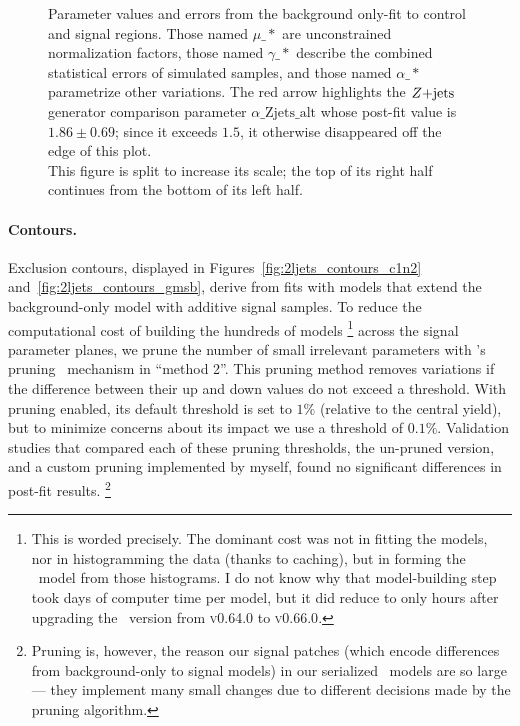 \begin{figure}[tp]
\centering
{}
\hfill
{}
\caption[
Parameter values and errors from the background only-fit to control and signal
regions
]{%
Parameter values and errors from the background only-fit to control and signal
regions.
Those named $\mu\_*$ are unconstrained normalization factors,
those named $\gamma\_*$ describe the combined statistical errors of simulated
samples,
and those named $\alpha\_*$ parametrize other variations.
The red arrow highlights the $Z\mathrm{+jets}$ generator comparison parameter
$\alpha\mathrm{\_Zjets\_alt}$ whose post-fit value is
$1.86 \pm 0.69$;
since it exceeds $1.5$, it otherwise disappeared off the edge of this plot.
\\[0.5em]
This figure is split to increase its scale; the top of its right half continues
from the bottom of its left half.
}
\label{fig:2ljets_fit_parameters}
\end{figure}

\paragraph{Contours.}
Exclusion contours, displayed in
Figures~\ref{fig:2ljets_contours_c1n2} and~\ref{fig:2ljets_contours_gmsb},
derive from fits with models that extend the background-only model with
additive signal samples.
To reduce the computational cost of building the hundreds of models%
\footnote{%
This is worded precisely. The dominant cost was not in fitting the models, nor
in histogramming the data (thanks to caching), but in forming the
\histfactory\ model from those histograms.
I do not know why that model-building step took days of computer time per
model, but it did reduce to only hours after upgrading the \histfitter\ version
from \textsc{v0.64.0} to \textsc{v0.66.0}.
}
across the signal parameter planes, we prune the number of small irrelevant
parameters with \histfitter's pruning~\cite{histfittergithub} mechanism in
``method 2''.
This pruning method removes variations if the difference between their up and
down values do not exceed a threshold.
With pruning enabled, its default threshold is set to $1\%$ (relative to the
central yield), but to minimize concerns about its impact we use a threshold
of $0.1\%$.
Validation studies that compared each of these pruning thresholds, the
un-pruned version, and a custom pruning implemented by myself, found no
significant differences in post-fit results.%
\footnote{%
Pruning is, however, the reason our signal patches (which encode differences
from background-only to signal models) in our serialized \hepdata\ models are
so large --- they implement many small changes due to different decisions made
by the pruning algorithm.
}

